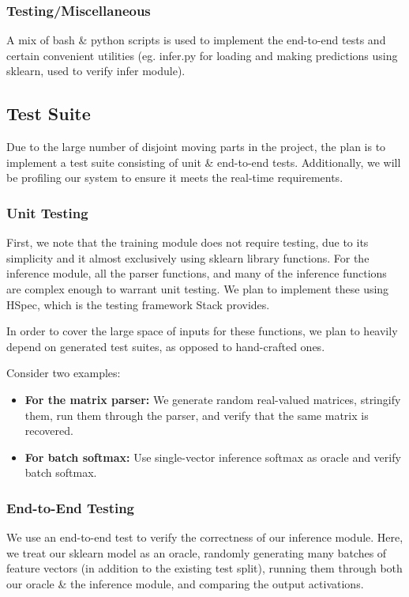 \documentclass[12pt, titlepage]{article}
\begin{document}
\subsubsection{Testing/Miscellaneous}
A mix of bash \& python scripts is used to implement the end-to-end tests and certain convenient utilities (eg. infer.py for loading and making predictions using sklearn, used to verify infer module). 

\subsection{Test Suite}
Due to the large number of disjoint moving parts in the project, the plan is to implement a test suite consisting of unit \& end-to-end tests. Additionally, we will be profiling our system to ensure it meets the real-time requirements.

\subsubsection{Unit Testing}
First, we note that the training module does not require testing, due to its simplicity and it almost exclusively using sklearn library functions. For the inference module, all the parser functions, and many of the inference functions are complex enough to warrant unit testing. We plan to implement these using HSpec, which is the testing framework Stack provides.\bigskip

In order to cover the large space of inputs for these functions, we plan to heavily depend on generated test suites, as opposed to hand-crafted ones.

Consider two examples:
\begin{itemize}
	\item \textbf{For the matrix parser:} We generate random real-valued matrices, stringify them, run them through the parser, and verify that the same matrix is recovered.
	\item \textbf{For batch softmax:} Use single-vector inference softmax as oracle and verify batch softmax.
\end{itemize}

\subsubsection{End-to-End Testing}
We use an end-to-end test to verify the correctness of our inference module. Here, we treat our sklearn model as an oracle, randomly generating many batches of feature vectors (in addition to the existing test split), running them through both our oracle \& the inference module, and comparing the output activations.
\end{document}
